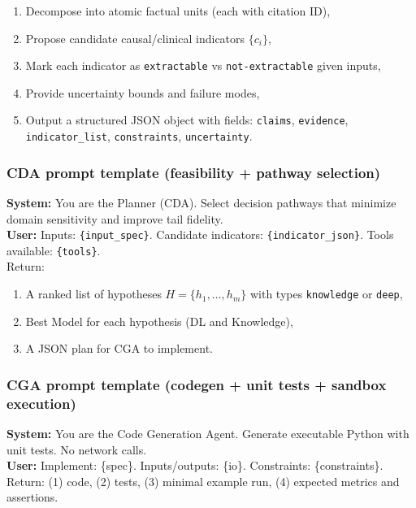 \documentclass{article}
\begin{document}
\begin{enumerate}
    \item Decompose into atomic factual units (each with citation ID),
    \item Propose candidate causal/clinical indicators $\{c_i\}$,
    \item Mark each indicator as \texttt{extractable} vs \texttt{not-extractable} given inputs,
    \item Provide uncertainty bounds and failure modes,
    \item Output a structured JSON object with fields:
    \texttt{claims}, \texttt{evidence}, \texttt{indicator\_list}, \texttt{constraints}, \texttt{uncertainty}.
\end{enumerate}

\subsubsection{CDA prompt template (feasibility + pathway selection)}
\label{app:cda_prompt}

\noindent\textbf{System:} You are the Planner (CDA). Select decision pathways that minimize domain sensitivity and improve tail fidelity.\\

\textbf{User:} Inputs: \texttt{\{input\_spec\}}. Candidate indicators: \texttt{\{indicator\_json\}}. Tools available: \texttt{\{tools\}}.\\
Return:

\begin{enumerate}
    \item A ranked list of hypotheses $H = \{h_1, \dots, h_m\}$ with types \texttt{knowledge} or \texttt{deep},
    \item Best Model for each hypothesis (DL and Knowledge),
    \item A JSON plan for CGA to implement.
\end{enumerate}

\subsubsection{CGA prompt template (codegen + unit tests + sandbox execution)}
\label{app:cga_prompt}
\noindent\textbf{System:} You are the Code Generation Agent. Generate executable Python with unit tests. No network calls.\\
\textbf{User:} Implement: \{spec\}. Inputs/outputs: \{io\}. Constraints: \{constraints\}.\\
Return:
(1) code, (2) tests, (3) minimal example run, (4) expected metrics and assertions.
\end{document}
